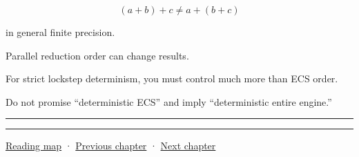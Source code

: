 \[
(a+b)+c
\neq
a+(b+c)
\]

in general finite precision.

Parallel reduction order can change results.

For strict lockstep determinism, you must control much more than ECS order.

Do not promise ``deterministic ECS'' and imply ``deterministic entire engine.''

\begin{center}\rule{0.5\linewidth}{0.5pt}\end{center}

\begin{center}\rule{0.5\linewidth}{0.5pt}\end{center}

\hyperref[volume-reading-map]{Reading map} · \hyperref[05-engine-i-ch016-archetypes-chunks-relationships-and-transforms]{Previous chapter} · \hyperref[05-engine-i-ch018-ecs-contracts-diagnostics-and-gpu-handoff]{Next chapter}
